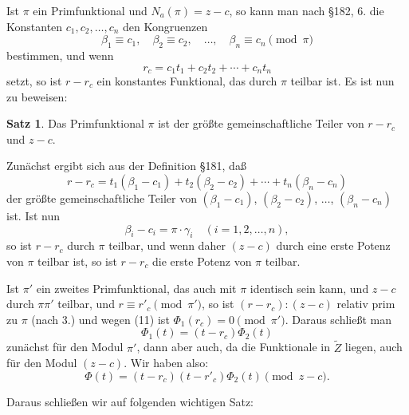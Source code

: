 \documentclass[12pt,a4paper]{article}
\theoremstyle{definition}
\newtheorem{satz}{Satz}[section]
\begin{document}
Ist $\pi$ ein Primfunktional und $N_a(\pi) = z - c$, so kann man nach \S 182, 6. die Konstanten $c_1, c_2, \ldots, c_n$ den Kongruenzen
\begin{equation}
\beta_1 \equiv c_1, \quad \beta_2 \equiv c_2, \quad \ldots, \quad \beta_n \equiv c_n \pmod{\pi}
\end{equation}
bestimmen, und wenn
\begin{equation}
r_c = c_1t_1 + c_2t_2 + \cdots + c_nt_n
\end{equation}
setzt, so ist $r - r_c$ ein konstantes Funktional, das durch $\pi$ teilbar ist. Es ist nun zu beweisen:

\begin{satz}
Das Primfunktional $\pi$ ist der größte gemeinschaftliche Teiler von $r - r_c$ und $z - c$.
\end{satz}

Zunächst ergibt sich aus der Definition \S 181, daß
\begin{equation}
r - r_c = t_1(\beta_1 - c_1) + t_2(\beta_2 - c_2) + \cdots + t_n(\beta_n - c_n)
\end{equation}
der größte gemeinschaftliche Teiler von $(\beta_1 - c_1)$, $(\beta_2 - c_2)$, $\ldots$, $(\beta_n - c_n)$ ist. Ist nun
\begin{equation}
\beta_i - c_i = \pi \cdot \gamma_i \quad (i = 1, 2, \ldots, n),
\end{equation}
so ist $r - r_c$ durch $\pi$ teilbar, und wenn daher $(z - c)$ durch eine erste Potenz von $\pi$ teilbar ist, so ist $r - r_c$ die erste Potenz von $\pi$ teilbar.

Ist $\pi'$ ein zweites Primfunktional, das auch mit $\pi$ identisch sein kann, und $z - c$ durch $\pi\pi'$ teilbar, und $r \equiv r'_c \pmod{\pi'}$, so ist $(r - r_c):(z - c)$ relativ prim zu $\pi$ (nach 3.) und wegen (11) ist $\Phi_1(r_c) = 0 \pmod{\pi'}$. Daraus schließt man
\[\Phi_1(t) = (t - r_c)\Phi_2(t)\]
zunächst für den Modul $\pi'$, dann aber auch, da die Funktionale in $\tilde{Z}$ liegen, auch für den Modul $(z - c)$. Wir haben also:
\begin{equation}
\Phi(t) = (t - r_c)(t - r'_c)\Phi_2(t) \pmod{z - c}.
\end{equation}

Daraus schließen wir auf folgenden wichtigen Satz:
\end{document}
